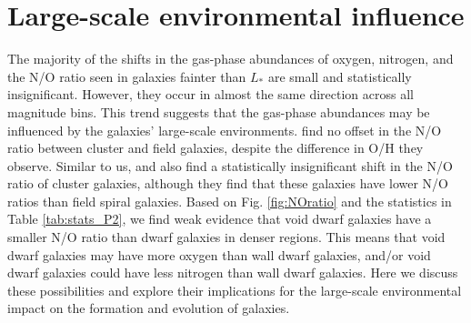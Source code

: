%
%
\section[Discussion]{Large-scale environmental influence}\label{sec:environment}

The majority of the shifts in the gas-phase abundances of oxygen, nitrogen, and 
the N/O ratio seen in galaxies fainter than $L_*$ are small and statistically 
insignificant.  However, they occur in almost the same direction across all 
magnitude bins.  This trend suggests that the gas-phase abundances may be 
influenced by the galaxies' large-scale environments.  \cite{Shields91} find no 
offset in the N/O ratio between cluster and field galaxies, despite the 
difference in O/H they observe.  Similar to us, \cite{Contini02} and 
\cite{Pilyugin02} also find a statistically insignificant shift in the N/O ratio 
of cluster galaxies, although they find that these galaxies have lower N/O 
ratios than field spiral galaxies.  Based on Fig. \ref{fig:NOratio} and the 
statistics in Table \ref{tab:stats_P2}, we find weak evidence that void dwarf 
galaxies have a smaller N/O ratio than dwarf galaxies in denser regions.  This 
means that void dwarf galaxies may have more oxygen than wall dwarf galaxies, 
and/or void dwarf galaxies could have less nitrogen than wall dwarf galaxies.  
Here we discuss these possibilities and explore their implications for the 
large-scale environmental impact on the formation and evolution of galaxies.

%

